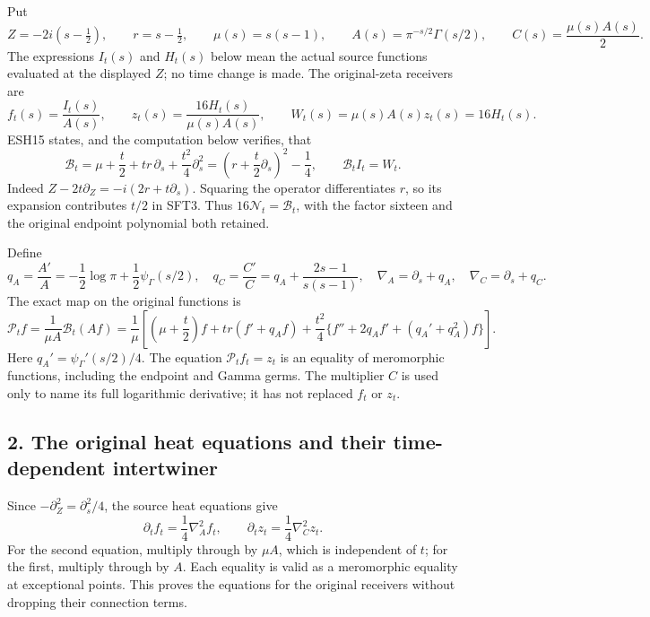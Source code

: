 \documentclass[
  10pt,
  a4paper,
]{article}
\begin{document}
Put \[
 Z=-2i(s-\tfrac12),\qquad r=s-\tfrac12,\qquad
 \mu(s)=s(s-1),\qquad
 A(s)=\pi^{-s/2}\Gamma(s/2),\qquad C(s)=\frac{\mu(s)A(s)}2.
 \tag{SFT1}
\] The expressions \(I_t(s)\) and \(H_t(s)\) below mean the actual
source functions evaluated at the displayed \(Z\); no time change is
made. The original-zeta receivers are \[
 f_t(s)=\frac{I_t(s)}{A(s)},\qquad
 z_t(s)=\frac{16H_t(s)}{\mu(s)A(s)},\qquad
 W_t(s)=\mu(s)A(s)z_t(s)=16H_t(s).
 \tag{SFT2}
\] ESH15 states, and the computation below verifies, that \[
 \mathcal B_t=\mu+\frac t2+tr\,\partial_s+
                  \frac{t^2}4\partial_s^2
            =\left(r+\frac t2\partial_s\right)^2-\frac14,
 \qquad
 \mathcal B_t I_t=W_t.
 \tag{SFT3}
\] Indeed \(Z-2t\partial_Z=-i(2r+t\partial_s)\). Squaring the operator
differentiates \(r\), so its expansion contributes \(t/2\) in SFT3. Thus
\(16\mathcal N_t=\mathcal B_t\), with the factor sixteen and the
original endpoint polynomial both retained.

Define \[
 q_A=\frac{A'}A=-\frac12\log\pi+\frac12\psi_\Gamma(s/2),
 \quad q_C=\frac{C'}C=q_A+\frac{2s-1}{s(s-1)},
 \quad \nabla_A=\partial_s+q_A,\quad
 \nabla_C=\partial_s+q_C.
 \tag{SFT4}
\] The exact map on the original functions is \[
 \boxed{\displaystyle
 \mathcal P_t f=
 \frac1{\mu A}\mathcal B_t(Af)
 =\frac1\mu\left[
    \left(\mu+\frac t2\right)f+
    tr(f'+q_Af)+
    \frac{t^2}4\{f''+2q_Af'+(q_A'+q_A^2)f\}
             \right].}
 \tag{SFT5}
\] Here \(q_A'=\psi_\Gamma'(s/2)/4\). The equation
\(\mathcal P_t f_t=z_t\) is an equality of meromorphic functions,
including the endpoint and Gamma germs. The multiplier \(C\) is used
only to name its full logarithmic derivative; it has not replaced
\(f_t\) or \(z_t\).

\subsection{2. The original heat equations and their time-dependent
intertwiner}\label{the-original-heat-equations-and-their-time-dependent-intertwiner}

Since \(-\partial_Z^2=\partial_s^2/4\), the source heat equations give
\[
 \partial_t f_t=\frac14\nabla_A^2 f_t,\qquad
 \partial_t z_t=\frac14\nabla_C^2 z_t.
 \tag{SFT6}
\] For the second equation, multiply through by \(\mu A\), which is
independent of \(t\); for the first, multiply through by \(A\). Each
equality is valid as a meromorphic equality at exceptional points. This
proves the equations for the original receivers without dropping their
connection terms.
\end{document}

